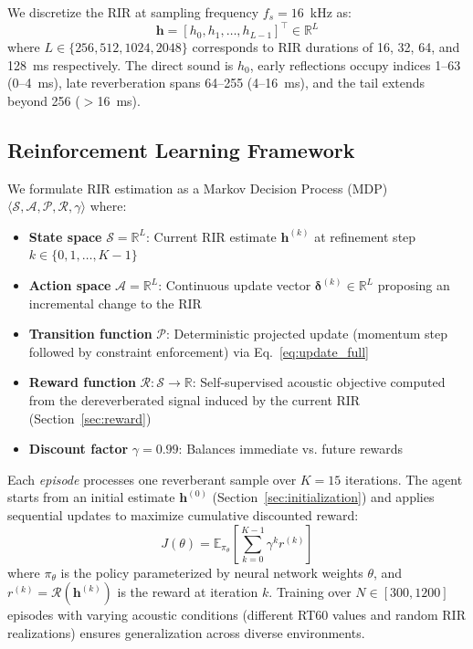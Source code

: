 \documentclass[12pt,a4paper]{article}
\begin{document}
We discretize the RIR at sampling frequency $f_s = 16$~kHz as:
\begin{equation}
\mathbf{h} = [h_0, h_1, \ldots, h_{L-1}]^\top \in \mathbb{R}^L
\label{eq:rir_vector}
\end{equation}
where $L \in \{256, 512, 1024, 2048\}$ corresponds to RIR durations of 16, 32, 64, and 128~ms respectively. The direct sound is $h_0$, early reflections occupy indices 1--63 (0--4~ms), late reverberation spans 64--255 (4--16~ms), and the tail extends beyond 256 ($>$16~ms).

\subsection{Reinforcement Learning Framework}

We formulate RIR estimation as a Markov Decision Process (MDP) $\langle \mathcal{S}, \mathcal{A}, \mathcal{P}, \mathcal{R}, \gamma \rangle$ where:
\begin{itemize}
\item \textbf{State space} $\mathcal{S} = \mathbb{R}^L$: Current RIR estimate $\mathbf{h}^{(k)}$ at refinement step $k \in \{0, 1, \ldots, K-1\}$
\item \textbf{Action space} $\mathcal{A} = \mathbb{R}^L$: Continuous update vector $\boldsymbol{\delta}^{(k)} \in \mathbb{R}^L$ proposing an incremental change to the RIR
\item \textbf{Transition function} $\mathcal{P}$: Deterministic projected update (momentum step followed by constraint enforcement) via Eq.~\eqref{eq:update_full}
\item \textbf{Reward function} $\mathcal{R}: \mathcal{S} \rightarrow \mathbb{R}$: Self-supervised acoustic objective computed from the dereverberated signal induced by the current RIR (Section~\ref{sec:reward})
\item \textbf{Discount factor} $\gamma = 0.99$: Balances immediate vs. future rewards
\end{itemize}

Each \textit{episode} processes one reverberant sample over $K=15$ iterations. The agent starts from an initial estimate $\mathbf{h}^{(0)}$ (Section~\ref{sec:initialization}) and applies sequential updates to maximize cumulative discounted reward:
\begin{equation}
J(\theta) = \mathbb{E}_{\pi_\theta}\left[\sum_{k=0}^{K-1} \gamma^k r^{(k)}\right]
\label{eq:objective}
\end{equation}
where $\pi_\theta$ is the policy parameterized by neural network weights $\theta$, and $r^{(k)} = \mathcal{R}(\mathbf{h}^{(k)})$ is the reward at iteration $k$. Training over $N \in [300, 1200]$ episodes with varying acoustic conditions (different RT60 values and random RIR realizations) ensures generalization across diverse environments.
\end{document}
